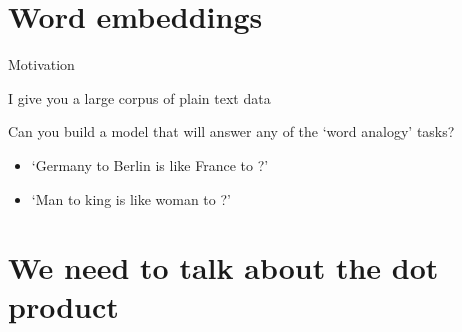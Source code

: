 \documentclass[12pt,aspectratio=169,handout]{beamer}
\begin{document}
\section{Word embeddings}

\begin{frame}{Motivation}

I give you a large corpus of plain text data

Can you build a model that will answer any of the `word analogy' tasks?

\begin{itemize}
	\item `Germany to Berlin is like France to ?'
	\item `Man to king is like woman to ?'
\end{itemize}

\end{frame}



\section{We need to talk about the dot product}
\end{document}
